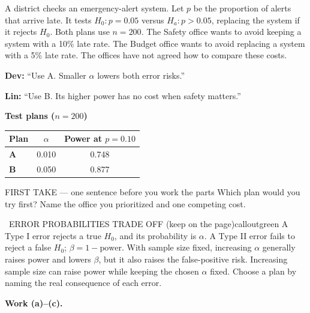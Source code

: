 \documentclass[11pt]{article}
\begin{document}


A district checks an emergency-alert system. Let $p$ be the proportion of alerts that arrive late. It tests $H_0:p=0.05$ versus $H_a:p>0.05$, replacing the system if it rejects $H_0$. Both plans use $n=200$. The Safety office wants to avoid keeping a system with a 10\% late rate. The Budget office wants to avoid replacing a system with a 5\% late rate. The offices have not agreed how to compare these costs.\par\smallskip \textbf{Dev:} ``Use A. Smaller $\alpha$ lowers both error risks.''\par \textbf{Lin:} ``Use B. Its higher power has no cost when safety matters.''\par
\begin{center}
\textbf{Test plans ($n=200$)}\par\smallskip
\begin{tabular}{|l|c|c|}
\hline
\textbf{Plan} & \textbf{$\alpha$} & \textbf{Power at $p=0.10$} \\ \hline
\textbf{A} & 0.010 & 0.748 \\ \hline
\textbf{B} & 0.050 & 0.877 \\ \hline
\end{tabular}
\end{center}
\begin{firsttakebox}{FIRST TAKE --- one sentence before you work the parts}
Which plan would you try first? Name the office you prioritized and one competing cost.
\workspace{0.9in}
\end{firsttakebox}

\begin{callout}{\IconBook\ ERROR PROBABILITIES TRADE OFF (keep on the page)}{calloutgreen}
A Type I error rejects a true $H_0$, and its probability is $\alpha$. A Type II error fails to reject a false
$H_0$; $\beta=1-\text{power}$. With sample size fixed, increasing $\alpha$ generally raises power and lowers
$\beta$, but it also raises the false-positive risk. Increasing sample size can raise power while keeping the
chosen $\alpha$ fixed. Choose a plan by naming the real consequence of each error.
\end{callout}

\newpage
\textbf{Work (a)--(c).}\par\smallskip
\end{document}
